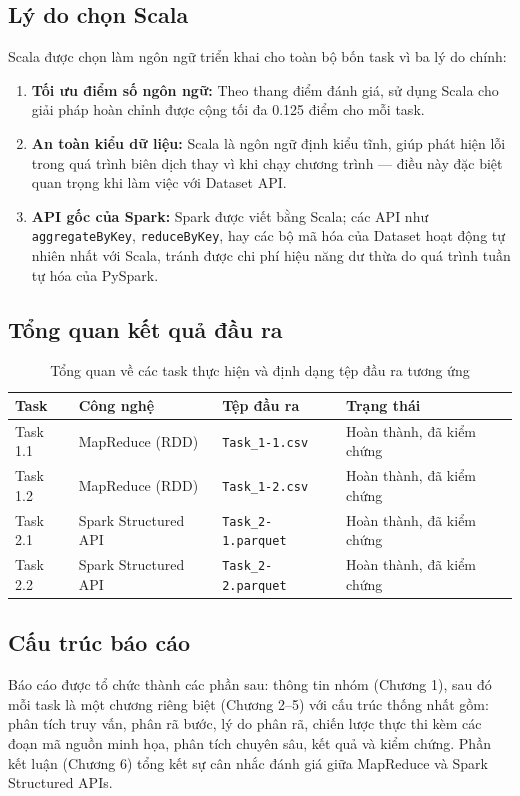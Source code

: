 \subsection{Lý do chọn Scala}

Scala được chọn làm ngôn ngữ triển khai cho toàn bộ bốn task vì ba lý do chính:
\begin{enumerate}
    \item \textbf{Tối ưu điểm số ngôn ngữ:} Theo thang điểm đánh giá, sử dụng Scala cho giải pháp hoàn chỉnh được cộng tối đa 0.125 điểm cho mỗi task.
    \item \textbf{An toàn kiểu dữ liệu:} Scala là ngôn ngữ định kiểu tĩnh, giúp phát hiện lỗi trong quá trình biên dịch thay vì khi chạy chương trình --- điều này đặc biệt quan trọng khi làm việc với Dataset API.
    \item \textbf{API gốc của Spark:} Spark được viết bằng Scala; các API như \texttt{aggregateByKey}, \texttt{reduceByKey}, hay các bộ mã hóa của Dataset hoạt động tự nhiên nhất với Scala, tránh được chi phí hiệu năng dư thừa do quá trình tuần tự hóa của PySpark.
\end{enumerate}

\subsection{Tổng quan kết quả đầu ra}

\begin{table}[H]
\centering
\begin{tabular}{llll}
\toprule
\textbf{Task} & \textbf{Công nghệ} & \textbf{Tệp đầu ra} & \textbf{Trạng thái} \\
\midrule
Task 1.1 & MapReduce (RDD) & \texttt{Task\_1-1.csv} & Hoàn thành, đã kiểm chứng \\
Task 1.2 & MapReduce (RDD) & \texttt{Task\_1-2.csv} & Hoàn thành, đã kiểm chứng \\
Task 2.1 & Spark Structured API & \texttt{Task\_2-1.parquet} & Hoàn thành, đã kiểm chứng \\
Task 2.2 & Spark Structured API & \texttt{Task\_2-2.parquet} & Hoàn thành, đã kiểm chứng \\
\bottomrule
\end{tabular}
\caption{Tổng quan về các task thực hiện và định dạng tệp đầu ra tương ứng}
\label{tab:tasks_summary}
\end{table}

\subsection{Cấu trúc báo cáo}

Báo cáo được tổ chức thành các phần sau: thông tin nhóm (Chương 1), sau đó mỗi task là một chương riêng biệt (Chương 2--5) với cấu trúc thống nhất gồm: phân tích truy vấn, phân rã bước, lý do phân rã, chiến lược thực thi kèm các đoạn mã nguồn minh họa, phân tích chuyên sâu, kết quả và kiểm chứng. Phần kết luận (Chương 6) tổng kết sự cân nhắc đánh giá giữa MapReduce và Spark Structured APIs.
